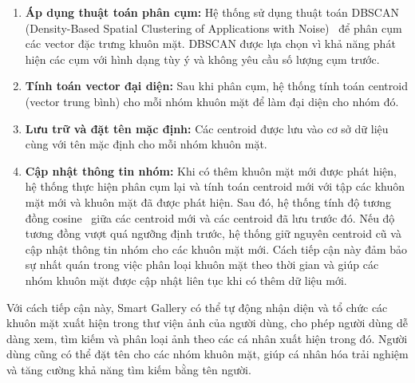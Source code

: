 \begin{enumerate}
    \item \textbf{Áp dụng thuật toán phân cụm:} Hệ thống sử dụng thuật toán DBSCAN (Density-Based Spatial Clustering of Applications with Noise)~\cite{dbscan} để phân cụm các vector đặc trưng khuôn mặt. DBSCAN được lựa chọn vì khả năng phát hiện các cụm với hình dạng tùy ý và không yêu cầu số lượng cụm trước.
    
    \item \textbf{Tính toán vector đại diện:} Sau khi phân cụm, hệ thống tính toán centroid (vector trung bình) cho mỗi nhóm khuôn mặt để làm đại diện cho nhóm đó.
    
    \item \textbf{Lưu trữ và đặt tên mặc định:} Các centroid được lưu vào cơ sở dữ liệu cùng với tên mặc định cho mỗi nhóm khuôn mặt.
    
    \item \textbf{Cập nhật thông tin nhóm:} Khi có thêm khuôn mặt mới được phát hiện, hệ thống thực hiện phân cụm lại và tính toán centroid mới với tập các khuôn mặt mới và khuôn mặt đã được phát hiện. Sau đó, hệ thống tính độ tương đồng cosine~\cite{cosine} giữa các centroid mới và các centroid đã lưu trước đó. Nếu độ tương đồng vượt quá ngưỡng định trước, hệ thống giữ nguyên centroid cũ và cập nhật thông tin nhóm cho các khuôn mặt mới. Cách tiếp cận này đảm bảo sự nhất quán trong việc phân loại khuôn mặt theo thời gian và giúp các nhóm khuôn mặt được cập nhật liên tục khi có thêm dữ liệu mới. 
\end{enumerate}

Với cách tiếp cận này, Smart Gallery có thể tự động nhận diện và tổ chức các khuôn mặt xuất hiện trong thư viện ảnh của người dùng, cho phép người dùng dễ dàng xem, tìm kiếm và phân loại ảnh theo các cá nhân xuất hiện trong đó. Người dùng cũng có thể đặt tên cho các nhóm khuôn mặt, giúp cá nhân hóa trải nghiệm và tăng cường khả năng tìm kiếm bằng tên người.

